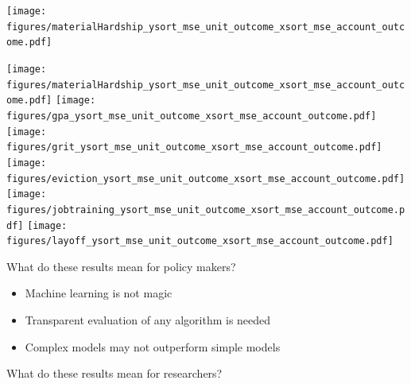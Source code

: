 \documentclass[aspectratio=169]{beamer}
\begin{document}
\begin{frame}

\begin{center}
\texttt{[image: figures/materialHardship\_ysort\_mse\_unit\_outcome\_xsort\_mse\_account\_outcome.pdf]}
\end{center}

\end{frame}
\begin{frame}

\begin{center}
\texttt{[image: figures/materialHardship\_ysort\_mse\_unit\_outcome\_xsort\_mse\_account\_outcome.pdf]}
\texttt{[image: figures/gpa\_ysort\_mse\_unit\_outcome\_xsort\_mse\_account\_outcome.pdf]}
\texttt{[image: figures/grit\_ysort\_mse\_unit\_outcome\_xsort\_mse\_account\_outcome.pdf]} \\
\texttt{[image: figures/eviction\_ysort\_mse\_unit\_outcome\_xsort\_mse\_account\_outcome.pdf]}
\texttt{[image: figures/jobtraining\_ysort\_mse\_unit\_outcome\_xsort\_mse\_account\_outcome.pdf]}
\texttt{[image: figures/layoff\_ysort\_mse\_unit\_outcome\_xsort\_mse\_account\_outcome.pdf]}
\end{center}

\end{frame}
\begin{frame}

\begin{center}
\Large{What do these results mean for policy makers?}
\end{center}

\end{frame}
\begin{frame}

\begin{itemize}
\item Machine learning is not magic\pause
\item Transparent evaluation of any algorithm is needed \pause
\item Complex models may not outperform simple models
\end{itemize}

\end{frame}
\begin{frame}

\begin{center}
\Large{What do these results mean for researchers?}
\end{center}

\end{frame}
\end{document}
